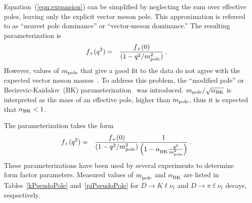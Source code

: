 
Equation~(\ref{eqn:expansion}) can be simplified by neglecting the 
sum over effective poles, leaving only the explicit vector meson pole. 
This approximation is referred to as ``nearest pole dominance'' or 
``vector-meson dominance.''  The resulting parameterization is
\begin{eqnarray}
  f_+(q^2) & = & \frac{f_+(0)}{(1-q^2/m^2_{\rm pole})}\,. 
\label{SimplePole}
\end{eqnarray}
However, values of $m_{{\rm pole}}$ that give a good fit to the data 
do not agree with the expected vector meson masses~\cite{Hill:2006ub}. 
To address this problem, the ``modified pole'' or Becirevic-Kaidalov~(BK) 
parameterization~\cite{Becirevic:1999kt} was introduced.
$m_{\rm pole} /\sqrt{\alpha_{\rm BK}}$
is interpreted as the mass of an effective pole, higher than $m_{\rm pole}$, thus it is expected that $\alpha_{\rm BK}<1$.

 

The parameterization takes the form
\begin{eqnarray}
f_+(q^2) & = & \frac{f_+(0)}{(1-q^2/m^2_{\rm pole})}
\frac{1}{\left(1-\alpha^{}_{\rm BK}\frac{q^2}{m^2_{\rm pole}}\right)}\,.
\end{eqnarray}
These parameterizations have been used by several experiments to 
determine form factor parameters.
Measured values of $m^{}_{\rm pole}$ and $\alpha^{}_{\rm BK}$ are
listed in Tables~\ref{kPseudoPole} and~\ref{piPseudoPole} for
$D\to K\ell\nu_{\ell}$ and $D\to\pi\ell\nu_{\ell}$ decays, respectively.


